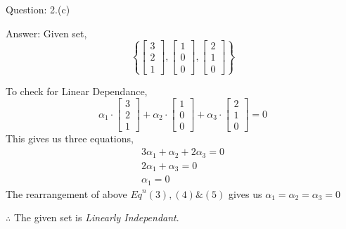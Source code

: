 \documentclass[a4paper]{article}
\begin{document}
\begin{qalist}
			
		\item[Question: 2.(c)] \setcounter{equation}{0} %
		\item[Answer:] Given set,
			\begin{equation}
				\left\{ \left[\begin{matrix}3 \\ 2 \\ 1\end{matrix}\right], 
					\left[\begin{matrix}1 \\ 0 \\ 0\end{matrix}\right], 
					\left[\begin{matrix}2 \\ 1 \\ 0\end{matrix}\right]
				\right\}
			\end{equation}
			
			To check for Linear Dependance,
			\begin{equation}
				{\alpha}_{1}\cdot\left[\begin{matrix}3 \\ 2 \\ 1\end{matrix}\right] + 
				{\alpha}_{2}\cdot\left[\begin{matrix}1 \\ 0 \\ 0\end{matrix}\right] + 
				{\alpha}_{3}\cdot\left[\begin{matrix}2 \\ 1 \\ 0\end{matrix}\right]
				 = 0
			\end{equation}
			This gives us three equations, 
			\begin{align}
				3{\alpha}_{1} + {\alpha}_{2} + 2{\alpha}_{3}= 0 \\
				2{\alpha}_{1} + {\alpha}_{3}= 0 \\
				{\alpha}_{1} = 0
			\end{align}
			The rearrangement of above ${Eq}^{n} (3), (4) \& (5)$ gives us ${\alpha}_{1} = {\alpha}_{2} = {\alpha}_{3} = 0$
			
			$\therefore$ The given set is \textit{Linearly Independant}.
			

\end{qalist}
\end{document}
